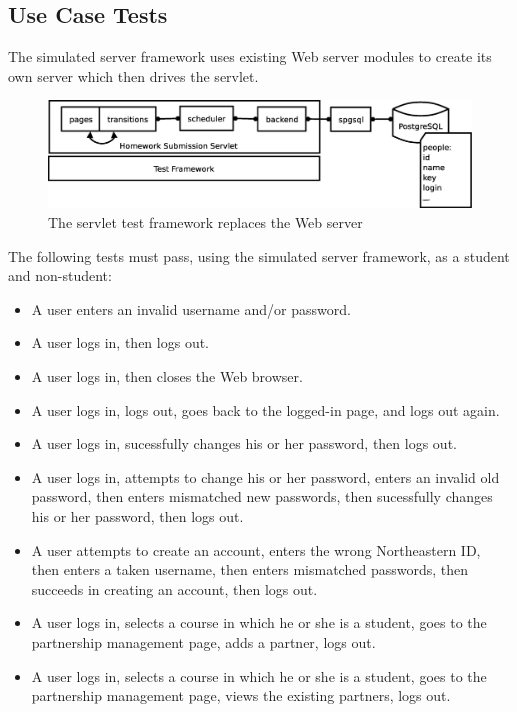 \documentclass[a4paper]{article}
\begin{document}
\subsection{Use Case Tests}\label{subsec:use-case-tests}

The simulated server framework uses existing Web server modules to create its
own server which then drives the servlet.

\begin{figure}[ht]
\centering
\includegraphics[scale=.30]{servlet-test.eps}
\caption{The servlet test framework replaces the Web server}
\label{fig:servlet-tests}
\end{figure}


The following tests must pass, using the simulated server framework, as a
student and non-student:

\begin{itemize}
\item{A user enters an invalid username and/or password.}
\item{A user logs in, then logs out.}
\item{A user logs in, then closes the Web browser.}
\item{A user logs in, logs out, goes back to the logged-in page, and logs out
  again.}
\item{A user logs in, sucessfully changes his or her password, then logs out.}
\item{A user logs in, attempts to change his or her password, enters an invalid
  old password, then enters mismatched new passwords, then sucessfully changes
  his or her password, then logs out.}
\item{A user attempts to create an account, enters the wrong Northeastern ID,
  then enters a taken username, then enters mismatched passwords, then succeeds
  in creating an account, then logs out.}
\item{A user logs in, selects a course in which he or she is a student, goes
  to the partnership management page, adds a partner, logs out.}
\item{A user logs in, selects a course in which he or she is a student, goes
  to the partnership management page, views the existing partners, logs out.}
\end{itemize}
\end{document}
